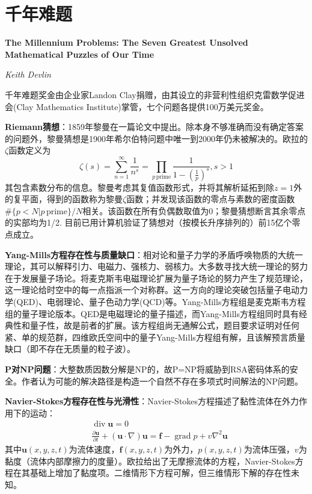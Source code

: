 \chapter{千年难题}
\Large\textbf{The Millennium Problems: The Seven Greatest Unsolved Mathematical Puzzles of Our Time}
\par \emph{Keith Devlin} \normalsize

\par 千年难题奖金由企业家Landon Clay捐赠，由其设立的非营利性组织克雷数学促进会(Clay Mathematics Institute)掌管，七个问题各提供100万美元奖金。

\par \textbf{Riemann猜想}：1859年黎曼在一篇论文中提出。除本身不够准确而没有确定答案的问题外，黎曼猜想是1900年希尔伯特问题中唯一到2000年仍未被解决的。欧拉的$\zeta$函数定义为
\begin{equation}
    \zeta(s)=\sum_{n=1}^\infty \frac{1}{n^s}=\prod_{p\, \text{prime}}\frac{1}{1-(\frac{1}{p})^s}, s>1
\end{equation}
其包含素数分布的信息。黎曼考虑其复值函数形式，并将其解析延拓到除$z=1$外的复平面，得到的函数称为黎曼$\zeta$函数；并发现该函数的零点与素数的密度函数$\#\{p<N\vert p\, \text{prime}\}/N$相关。该函数在所有负偶数取值为0；黎曼猜想断言其余零点的实部均为1/2. 目前已用计算机验证了猜想对（按模长升序排列的）前15亿个零点成立。

\par \textbf{Yang-Mills方程存在性与质量缺口}：相对论和量子力学的矛盾呼唤物质的大统一理论，其可以解释引力、电磁力、强核力、弱核力。大多数寻找大统一理论的努力在于发展量子场论。将麦克斯韦电磁理论扩展为量子场论的努力产生了规范理论，这一理论给时空中的每一点指派一个对称群。这一方向的理论突破包括量子电动力学(QED)、电弱理论、量子色动力学(QCD)等。Yang-Mills方程组是麦克斯韦方程组的量子理论版本。QED是电磁理论的量子描述，而Yang-Mills方程组同时具有经典性和量子性，故是前者的扩展。该方程组尚无通解公式，题目要求证明对任何紧、单的规范群，四维欧氏空间中的量子Yang-Mills方程组有解，且该解预言质量缺口（即不存在无质量的粒子波）。

\par \textbf{P对NP问题}：大整数质因数分解是NP的，故P=NP将威胁到RSA密码体系的安全。作者认为可能的解决路径是构造一个自然不存在多项式时间解法的NP问题。

\par \textbf{Navier-Stokes方程存在性与光滑性}：Navier-Stokes方程描述了黏性流体在外力作用下的运动：
\begin{align}
    &\operatorname{div} \mathbf{u} =0\\
    &\frac{\partial \mathbf{u}}{\partial t}+(\mathbf{u}\cdot  \nabla)\mathbf{u}=\mathbf{f}-\operatorname{grad} p + v \nabla^2 \mathbf{u}
\end{align}
其中$\mathbf{u}(x,y,z,t)$为流体速度，$\mathbf{f}(x,y,z,t)$为外力，$p(x,y,z,t)$为流体压强，$v$为黏度（流体内部摩擦力的度量）。欧拉给出了无摩擦流体的方程，Navier-Stokes方程在其基础上增加了黏度项。二维情形下方程可解，但三维情形下解的存在性未知。

